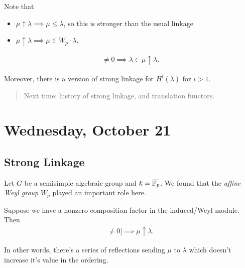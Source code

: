 \begin{remark}

Note that

\begin{itemize}
\tightlist
\item
  \(\mu \uparrow \lambda \implies \mu \leq \lambda\), so this is
  stronger than the usual linkage
\item
  \(\mu \uparrow \lambda \implies \mu \in W_p \cdot \lambda\).
\end{itemize}

\end{remark}

\begin{theorem}

\begin{align*}  
[H^0(\lambda): L(\mu)] \neq 0 \implies \lambda \in \mu \uparrow \lambda
.\end{align*}

Moreover, there is a version of strong linkage for \(H^i(\lambda)\) for
\(i> 1\).

\end{theorem}

\begin{quote}
Next time: history of strong linkage, and translation functors.
\end{quote}

\hypertarget{wednesday-october-21}{%
\section{Wednesday, October 21}\label{wednesday-october-21}}

\hypertarget{strong-linkage}{%
\subsection{Strong Linkage}\label{strong-linkage}}

Let \(G\) be a semisimple algebraic group and
\(k = \mkern 1.5mu\overline{\mkern-1.5mu{\mathbb{F}}_p\mkern-1.5mu}\mkern 1.5mu\).
We found that the \emph{affine Weyl group} \(W_p\) played an important
role here.

\begin{theorem}

Suppose we have a nonzero composition factor in the induced/Weyl module.
Then
\begin{align*}
[H^0 \lambda : L(\mu)] \neq 0]\implies \mu \uparrow \lambda
.\end{align*}

In other words, there's a series of reflections sending \(\mu\) to
\(\lambda\) which doesn't increase it's value in the ordering.

\end{theorem}

